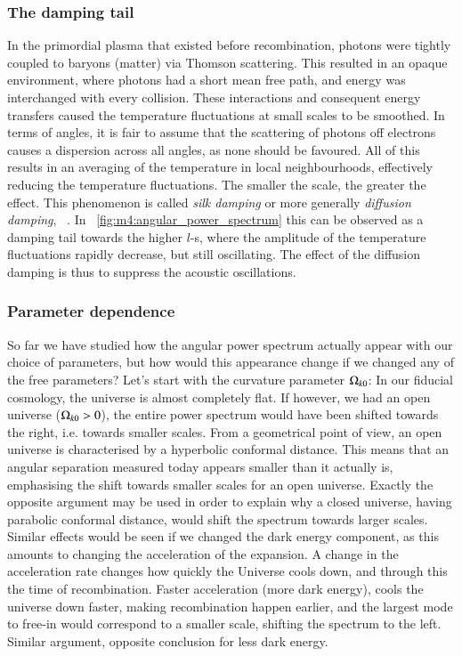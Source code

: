     \subsubsection{The damping tail}
        In the primordial plasma that existed before recombination, photons were tightly coupled to baryons (matter) via Thomson scattering. This resulted in an opaque environment, where photons had a short mean free path, and energy was interchanged with every collision. These interactions and consequent energy transfers caused the temperature fluctuations at small scales to be smoothed. In terms of angles, it is fair to assume that the scattering of photons off electrons causes a dispersion across all angles, as none should be favoured. All of this results in an averaging of the temperature in local neighbourhoods, effectively reducing the temperature fluctuations. The smaller the scale, the greater the effect. This phenomenon is called \textit{silk damping} or more generally \textit{diffusion damping}, ~\cite{dodelson2020modern}. In ~\cref{fig:m4:angular_power_spectrum} this can be observed as a damping tail towards the higher $l$-s, where the amplitude of the temperature fluctuations rapidly decrease, but still oscillating. The effect of the diffusion damping is thus to suppress the acoustic oscillations. 

    \subsubsection{Parameter dependence}
        So far we have studied how the angular power spectrum actually appear with our choice of parameters, but how would this appearance change if we changed any of the free parameters? Let's start with the curvature parameter $\Omega_{k0}$: In our fiducial cosmology, the universe is almost completely flat. If however, we had an open universe ($\Omega_{k0}>0$), the entire power spectrum would have been shifted towards the right, i.e. towards smaller scales. From a geometrical point of view, an open universe is characterised by a hyperbolic conformal distance. This means that an angular separation measured today appears smaller than it actually is, emphasising the shift towards smaller scales for an open universe. Exactly the opposite argument may be used in order to explain why a closed universe, having parabolic conformal distance, would shift the spectrum towards larger scales. Similar effects would be seen if we changed the dark energy component, as this amounts to changing the acceleration of the expansion. A change in the acceleration rate changes how quickly the Universe cools down, and through this the time of recombination. Faster acceleration (more dark energy), cools the universe down faster, making recombination happen earlier, and the largest mode to free-in would correspond to a smaller scale, shifting the spectrum to the left. Similar argument, opposite conclusion for less dark energy. 

